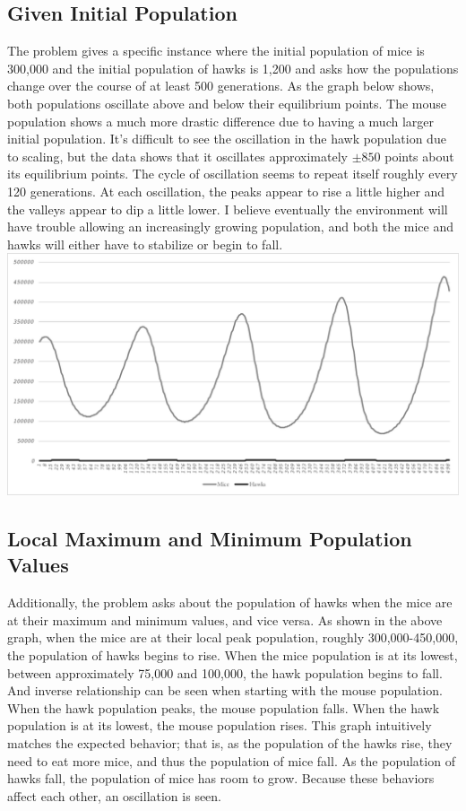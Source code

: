 \documentclass[10pt,letterpaper]{article}
\begin{document}
		\subsection{Given Initial Population}
			The problem gives a specific instance where the initial population of mice is 300,000 and the initial population of hawks is 1,200 and asks how the populations change over the course of at least 500 generations. 
			\newline \newline
			As the graph below shows, both populations oscillate above and below their equilibrium points. The mouse population shows a much more drastic difference due to having a much larger initial population. It's difficult to see the oscillation in the hawk population due to scaling, but the data shows that it oscillates approximately $\pm 850$ points about its equilibrium points. 
			\newline \newline
			The cycle of oscillation seems to repeat itself roughly every 120 generations. At each oscillation, the peaks appear to rise a little higher and the valleys appear to dip a little lower. I believe eventually the environment will have trouble allowing an increasingly growing population, and both the mice and hawks will either have to stabilize or begin to fall.
			\newline
			\includegraphics[width=\textwidth]{graph1.pdf}
		\subsection{Local Maximum and Minimum Population Values}
			Additionally, the problem asks about the population of hawks when the mice are at their maximum and minimum values, and vice versa. As shown in the above graph, when the mice are at their local peak population, roughly 300,000-450,000, the population of hawks begins to rise. When the mice population is at its lowest, between approximately 75,000 and 100,000, the hawk population begins to fall. And inverse relationship can be seen when starting with the mouse population. When the hawk population peaks, the mouse population falls. When the hawk population is at its lowest, the mouse population rises. This graph intuitively matches the expected behavior; that is, as the population of the hawks rise, they need to eat more mice, and thus the population of mice fall. As the population of hawks fall, the population of mice has room to grow. Because these behaviors affect each other, an oscillation is seen.
\end{document}
